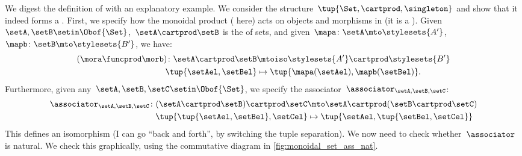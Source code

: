 
\begin{example}
    We digest the definition of  with an explanatory example.
    We consider the structure~$\tup{\Set,\cartprod,\singleton}$ and show that it indeed forms a .
    First, we specify how the monoidal product ( here) acts on objects and morphisms in \Set (it is a ).
    Given~$\setA,\setB\setin \Obof{\Set}$,~$\setA\cartprod \setB$ is the  of sets, and given~$\mapa\colon \setA\mto \stylesets{A'}$,~$\mapb\colon \setB\mto \stylesets{B'}$, we have:
    \begin{equation}
        \label{eq:set_mon_prod_2}
        \begin{aligned}
            (\mora \funcprod \morb)
            \colon \setA\cartprod \setB & \mtoiso \stylesets{A'}\cartprod \stylesets{B'} \\
            \tup{\setAel,\setBel}       & \mapsto \tup{\mapa(\setAel),\mapb(\setBel)}.
        \end{aligned}
    \end{equation}
    Furthermore, given any~$\setA,\setB,\setC\setin \Obof{\Set}$, we specify the associator~$\associator_{\setA,\setB,\setC}$:
    \begin{equation}
        \label{eq:set_mon_prod_3}
        \begin{aligned}
            \associator_{\setA,\setB,\setC}\colon (\setA\cartprod \setB)\cartprod \setC & \mto \setA\cartprod (\setB\cartprod \setC) \\
            \tup{\tup{\setAel,\setBel},\setCel}                                         & \mapsto \tup{\setAel,\tup{\setBel,\setCel}}
        \end{aligned}
    \end{equation}
    This defines an isomorphism (I can go ``back and forth'', by switching the tuple separation).
    We now need to check whether~$\associator$ is natural.
    We check this graphically, using the commutative diagram in \cref{fig:monoidal_set_ass_nat}.


\end{example}
